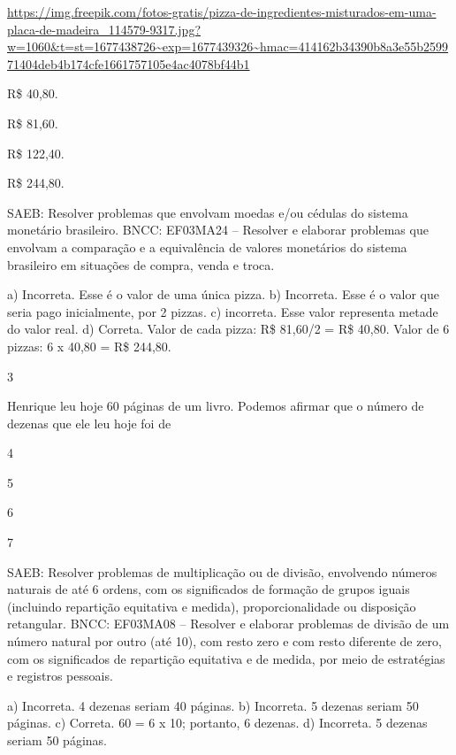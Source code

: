 \begin{multicols}{2}
{\begin{escolha}
{\url{https://img.freepik.com/fotos-gratis/pizza-de-ingredientes-misturados-em-uma-placa-de-madeira_114579-9317.jpg?w=1060\&t=st=1677438726~exp=1677439326~hmac=414162b34390b8a3e55b259971404deb4b174cfe1661757105e4ac4078bf44b1}

\begin{escolha}

\item
  R\$ 40,80.
\item
  R\$ 81,60.
\item
  R\$ 122,40.
\item
  R\$ 244,80.
\end{escolha}

SAEB: Resolver problemas que envolvam moedas e/ou cédulas do sistema monetário brasileiro.
BNCC: EF03MA24 -- Resolver e elaborar problemas que envolvam a comparação e a equivalência de
valores monetários do sistema brasileiro em situações de compra, venda e troca.

a) Incorreta. Esse é o valor de uma única pizza.
b) Incorreta. Esse é o valor que seria pago inicialmente, por 2 pizzas.
c) incorreta. Esse valor representa metade do valor real.
d) Correta. Valor de cada pizza: R\$ 81,60/2 = R\$ 40,80. Valor de 6 pizzas: 6 x 40,80 = R\$ 244,80.

\num{3}

Henrique leu hoje 60 páginas de um livro. Podemos afirmar que o número de dezenas que ele leu hoje foi de

\begin{escolha}

\item
  4
\item
  5
\item
  6
\item
  7
\end{escolha}

SAEB: Resolver problemas de multiplicação ou de divisão, envolvendo números naturais de até 6 ordens, com os significados de formação de grupos iguais (incluindo repartição equitativa e medida),
proporcionalidade ou disposição retangular.
BNCC: EF03MA08 -- Resolver e elaborar problemas de divisão de um número natural por outro (até
10), com resto zero e com resto diferente de zero, com os significados de repartição equitativa
e de medida, por meio de estratégias e registros pessoais.

a) Incorreta. 4 dezenas seriam 40 páginas.
b) Incorreta. 5 dezenas seriam 50 páginas.
c) Correta. 60 = 6 x 10; portanto, 6 dezenas.
d) Incorreta. 5 dezenas seriam 50 páginas.

}
\end{escolha}}
\end{multicols}
